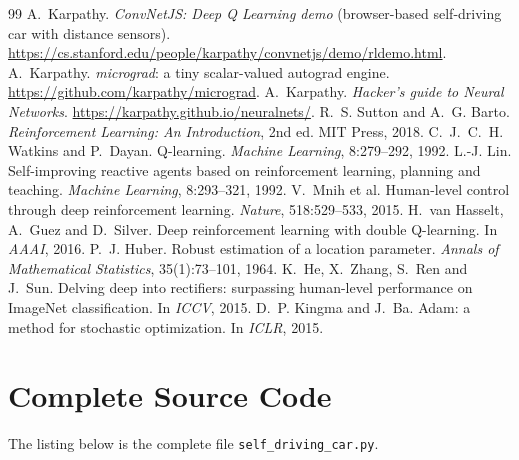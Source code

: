 \documentclass[11pt,a4paper]{article}
\newcommand{\code}[1]{\texttt{#1}}
\begin{document}
\begin{thebibliography}{99}
 A.~Karpathy. \emph{ConvNetJS: Deep Q Learning demo} (browser-based self-driving car with distance sensors). \url{https://cs.stanford.edu/people/karpathy/convnetjs/demo/rldemo.html}.
 A.~Karpathy. \emph{micrograd}: a tiny scalar-valued autograd engine. \url{https://github.com/karpathy/micrograd}.
 A.~Karpathy. \emph{Hacker's guide to Neural Networks}. \url{https://karpathy.github.io/neuralnets/}.
 R.~S. Sutton and A.~G. Barto. \emph{Reinforcement Learning: An Introduction}, 2nd ed. MIT Press, 2018.
 C.~J.~C.~H. Watkins and P.~Dayan. Q-learning. \emph{Machine Learning}, 8:279--292, 1992.
 L.-J. Lin. Self-improving reactive agents based on reinforcement learning, planning and teaching. \emph{Machine Learning}, 8:293--321, 1992.
 V.~Mnih et al. Human-level control through deep reinforcement learning. \emph{Nature}, 518:529--533, 2015.
 H.~van Hasselt, A.~Guez and D.~Silver. Deep reinforcement learning with double Q-learning. In \emph{AAAI}, 2016.
 P.~J. Huber. Robust estimation of a location parameter. \emph{Annals of Mathematical Statistics}, 35(1):73--101, 1964.
 K.~He, X.~Zhang, S.~Ren and J.~Sun. Delving deep into rectifiers: surpassing human-level performance on ImageNet classification. In \emph{ICCV}, 2015.
 D.~P. Kingma and J.~Ba. Adam: a method for stochastic optimization. In \emph{ICLR}, 2015.
\end{thebibliography}

\appendix
\section{Complete Source Code}\label{app:code}
The listing below is the complete file \code{self\_driving\_car.py}.

\end{document}
